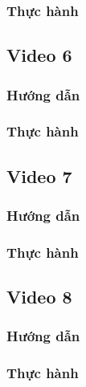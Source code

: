 \documentclass{article}
\begin{document}
\subsubsection{Thực hành}




\subsection{Video 6}
\subsubsection{Hướng dẫn}

\subsubsection{Thực hành}




\subsection{Video 7}
\subsubsection{Hướng dẫn}

\subsubsection{Thực hành}




\subsection{Video 8}
\subsubsection{Hướng dẫn}

\subsubsection{Thực hành}








\end{document}

